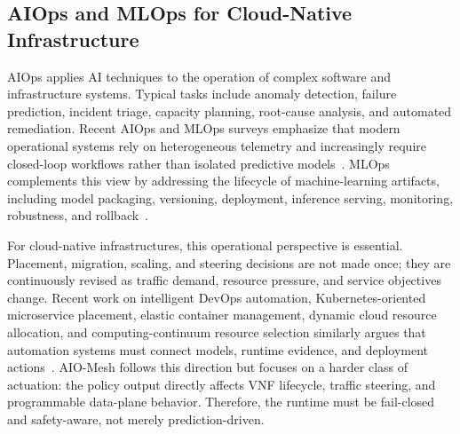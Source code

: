\documentclass[final,5p]{elsarticle}
\begin{document}
\subsection{AIOps and MLOps for Cloud-Native Infrastructure}
\label{subsec:related_aiops}

AIOps applies AI techniques to the operation of complex software and infrastructure systems. Typical tasks include anomaly detection, failure prediction, incident triage, capacity planning, root-cause analysis, and automated remediation. Recent AIOps and MLOps surveys emphasize that modern operational systems rely on heterogeneous telemetry and increasingly require closed-loop workflows rather than isolated predictive models~\cite{diazdearcaya2024joint,zhang2025aiopsllm}. MLOps complements this view by addressing the lifecycle of machine-learning artifacts, including model packaging, versioning, deployment, inference serving, monitoring, robustness, and rollback~\cite{kreuzberger2023mlops,eken2025mlops,bayram2025trustworthy}.

For cloud-native infrastructures, this operational perspective is essential. Placement, migration, scaling, and steering decisions are not made once; they are continuously revised as traffic demand, resource pressure, and service objectives change. Recent work on intelligent DevOps automation, Kubernetes-oriented microservice placement, elastic container management, dynamic cloud resource allocation, and computing-continuum resource selection similarly argues that automation systems must connect models, runtime evidence, and deployment actions~\cite{eramo2024architecture,ding2023kubernetes,mao2023flowcon,chen2023workloadwindows,chen2024crossedge,sedghani2024space4aid}. AIO-Mesh follows this direction but focuses on a harder class of actuation: the policy output directly affects VNF lifecycle, traffic steering, and programmable data-plane behavior. Therefore, the runtime must be fail-closed and safety-aware, not merely prediction-driven.
\end{document}
